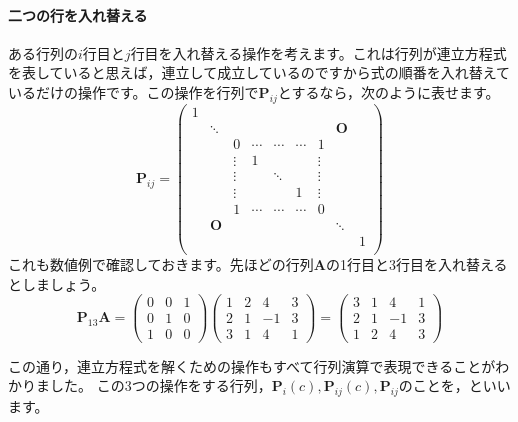 \documentclass{ltjsbook}
\begin{document}
\paragraph{二つの行を入れ替える}
ある行列の$i$行目と$j$行目を入れ替える操作を考えます。これは行列が連立方程式を表していると思えば，連立して成立しているのですから式の順番を入れ替えているだけの操作です。この操作を行列で$\bm{P}_{ij}$とするなら，次のように表せます。
\[
	\bm{P}_{ij} =
	\begin{pmatrix}
		1 &        &        &        &        &        &        &        &   \\
		  & \ddots &        &        &        &        &        & \bm{O} &   \\
		  &        & 0      & \cdots & \cdots & \cdots & 1      &        &   \\
		  &        & \vdots & 1      &        &        & \vdots &        &   \\
		  &        & \vdots &        & \ddots &        & \vdots &        &   \\
		  &        & \vdots &        &        & 1      & \vdots &        &   \\
		  &        & 1      & \cdots & \cdots & \cdots & 0      &        &   \\
		  & \bm{O} &        &        &        &        &        & \ddots &   \\
		  &        &        &        &        &        &        &        & 1 \\
	\end{pmatrix}
\]
これも数値例で確認しておきます。先ほどの行列$\bm{A}$の1行目と3行目を入れ替えるとしましょう。
\[
	\bm{P}_{13}\bm{A} =
	\begin{pmatrix} 0 & 0 & 1 \\ 0 & 1 & 0 \\ 1 & 0 & 0 \end{pmatrix}
	\begin{pmatrix} 1 & 2 & 4 & 3 \\ 2 & 1 & -1 & 3 \\ 3 & 1 & 4 & 1 \end{pmatrix}
	=
	\begin{pmatrix} 3 & 1 & 4 & 1 \\ 2 & 1 & -1 & 3 \\ 1 & 2 & 4 & 3 \end{pmatrix}
\]

この通り，連立方程式を解くための操作もすべて行列演算で表現できることがわかりました。
この3つの操作をする行列，$\bm{P}_i(c), \bm{P}_{ij}(c),\bm{P}_{ij}$のことを，といいます。
\end{document}
